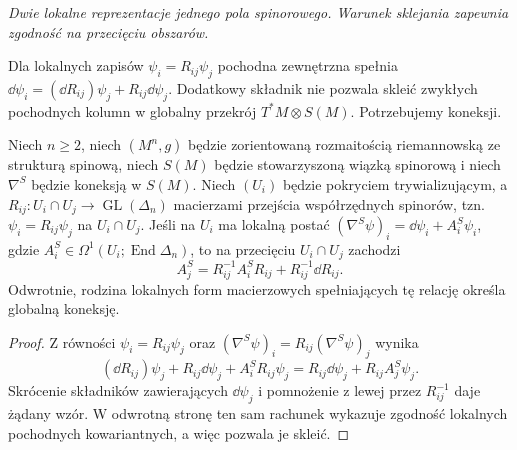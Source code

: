\begin{center}

{\small\itshape Dwie lokalne reprezentacje jednego pola spinorowego.
Warunek sklejania zapewnia zgodność na przecięciu obszarów.}
\end{center}

Dla lokalnych zapisów $\psi_i=R_{ij}\psi_j$ pochodna
zewnętrzna spełnia
$\dd\psi_i=(\dd R_{ij})\psi_j+R_{ij}\dd\psi_j$.
Dodatkowy składnik nie pozwala skleić zwykłych
pochodnych kolumn w globalny przekrój
$T^*M\otimes S(M)$. Potrzebujemy koneksji.

\begin{stwierdzenie}
\label{prop:pola-spinorowe-transformacja-koneksji}
Niech $n\geq2$, niech $(M^n,g)$ będzie zorientowaną
rozmaitością riemannowską ze strukturą spinową,
niech $S(M)$ będzie stowarzyszoną wiązką spinorową
i niech $\nabla^S$ będzie koneksją w $S(M)$.
Niech $(U_i)$ będzie pokryciem trywializującym,
a $R_{ij}:U_i\cap U_j\to\operatorname{GL}(\Delta_n)$
macierzami przejścia współrzędnych spinorów, tzn.
$\psi_i=R_{ij}\psi_j$ na $U_i\cap U_j$.
Jeśli na $U_i$ ma lokalną postać
$(\nabla^S\psi)_i=\dd\psi_i+A_i^S\psi_i$,
gdzie $A_i^S\in\Omega^1(U_i;\operatorname{End}\Delta_n)$,
to na przecięciu $U_i\cap U_j$ zachodzi
\begin{equation}\label{eq:pola-spinorowe-transformacja-koneksji}
 A_j^S=R_{ij}^{-1}A_i^SR_{ij}+R_{ij}^{-1}\dd R_{ij}.
\end{equation}
Odwrotnie, rodzina lokalnych form macierzowych
spełniających tę relację określa globalną koneksję.
\end{stwierdzenie}
\begin{proof}
Z równości $\psi_i=R_{ij}\psi_j$ oraz
$(\nabla^S\psi)_i=R_{ij}(\nabla^S\psi)_j$
wynika
\[
 (\dd R_{ij})\psi_j+R_{ij}\dd\psi_j
   +A_i^SR_{ij}\psi_j
 =R_{ij}\dd\psi_j+R_{ij}A_j^S\psi_j.
\]
Skrócenie składników zawierających $\dd\psi_j$
i pomnożenie z lewej przez $R_{ij}^{-1}$ daje
żądany wzór. W odwrotną stronę ten sam rachunek
wykazuje zgodność lokalnych pochodnych kowariantnych,
a więc pozwala je skleić.
\end{proof}

